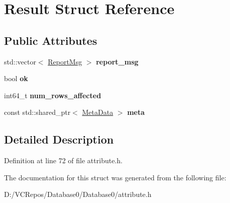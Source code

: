 \hypertarget{struct_result}{}\section{Result Struct Reference}
\label{struct_result}
\subsection*{Public Attributes}
\begin{DoxyCompactItemize}
\item 
\mbox{\label{struct_result_a4106f13117ec8bbe89a41d17329179c1}} 
std\+::vector$<$ \mbox{\hyperlink{struct_report_msg}{Report\+Msg}} $>$ {\bfseries report\+\_\+msg}
\item 
\mbox{\label{struct_result_ac067e17010dbf907b000789b750cd368}} 
bool {\bfseries ok}
\item 
\mbox{\label{struct_result_aed58063cba5497597c90c6719386351c}} 
int64\+\_\+t {\bfseries num\+\_\+rows\+\_\+affected}
\item 
\mbox{\label{struct_result_a2aef5d3ba0f08ec7a23d0cfeb6e5f957}} 
const std\+::shared\+\_\+ptr$<$ \mbox{\hyperlink{struct_meta_data}{Meta\+Data}} $>$ {\bfseries meta}
\end{DoxyCompactItemize}


\subsection{Detailed Description}


Definition at line 72 of file attribute.\+h.



The documentation for this struct was generated from the following file\+:\begin{DoxyCompactItemize}
\item 
D\+:/\+V\+C\+Repos/\+Database0/\+Database0/attribute.\+h\end{DoxyCompactItemize}
